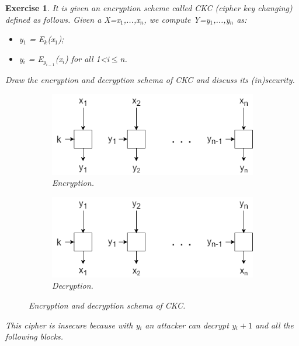 \documentclass[a4paper, 12pt]{report}
\newtheorem{exercise}{\textbf{Exercise}}
\begin{document}
\begin{exercise}
	It is given an encryption scheme called CKC (cipher key changing) defined as follows. Given a X=x$_1$,...,x$_n$, we compute Y=y$_1$,...,y$_n$ as:
	\begin{itemize}
		\item y$_1$ = E$_k$(x$_1$);
		\item y$_i$ = E$_{y_{i-1}}$(x$_i$) for all 1<i$\le$n.
	\end{itemize}
	Draw the encryption and decryption schema of CKC and discuss its (in)security.
	\vspace{10mm}
	\begin{figure}[H]
		\centering
		\begin{subfigure}{.5\textwidth}
			\centering
			\includegraphics[width=.7\linewidth]{images/Lec14/encCKC.png}
			\caption{Encryption.}
			\label{fig:encCKC}
		\end{subfigure}%
		\begin{subfigure}{.5\textwidth}
			\centering
			\includegraphics[width=.7\linewidth]{images/Lec14/decCKC.png}
			\caption{Decryption.}
			\label{fig:decCKC}
		\end{subfigure}
		\caption{Encryption and decryption schema of CKC.}
		\label{fig:encdecCKC}
	\end{figure}
	This cipher is insecure because with y$_i$ an attacker can decrypt y$_i+1$ and all the following blocks.
\end{exercise}
\end{document}

